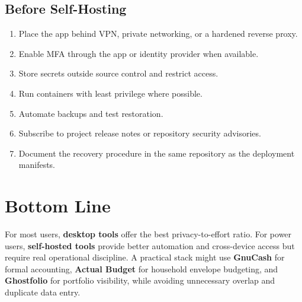 \documentclass[11pt]{article}
\newcommand{\tool}[1]{\textbf{#1}}
\begin{document}
\subsection{Before Self-Hosting}

\begin{enumerate}
  \item Place the app behind VPN, private networking, or a hardened reverse proxy.
  \item Enable MFA through the app or identity provider when available.
  \item Store secrets outside source control and restrict access.
  \item Run containers with least privilege where possible.
  \item Automate backups and test restoration.
  \item Subscribe to project release notes or repository security advisories.
  \item Document the recovery procedure in the same repository as the deployment manifests.
\end{enumerate}

\section{Bottom Line}

For most users, \tool{desktop tools} offer the best privacy-to-effort ratio. For power users, \tool{self-hosted tools} provide better automation and cross-device access but require real operational discipline. A practical stack might use \tool{GnuCash} for formal accounting, \tool{Actual Budget} for household envelope budgeting, and \tool{Ghostfolio} for portfolio visibility, while avoiding unnecessary overlap and duplicate data entry.
\end{document}
